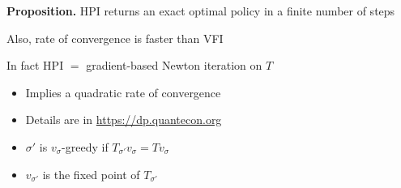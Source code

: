 \documentclass[xcolor=dvipsnames]{beamer}
\newcommand{\1}{\mathbbm 1}
\begin{document}
\begin{frame}
    
    \begin{block}{}
        {\bf Proposition.} 
            HPI returns an exact optimal policy in a finite number of steps
    \end{block}

    \vspace{0.5em}
    \vspace{0.5em}
    \vspace{0.5em}

    Also, rate of convergence is faster than VFI 

    \vspace{0.5em}
    \vspace{0.5em}

    In fact HPI $=$ gradient-based Newton iteration on $T$
    \vspace{0.5em}

    \begin{itemize}
        \item Implies a quadratic rate of convergence
        \vspace{0.5em}
        \item Details are in \url{https://dp.quantecon.org}
    \end{itemize}


\end{frame}

\begin{frame}
 
    \begin{figure} 
        \centering
    \end{figure}

    \begin{itemize}
        \item $\sigma'$ is $v_\sigma$-greedy if $T_{\sigma'} v_\sigma = T
            v_\sigma$
        \vspace{0.5em}
        \item $v_{\sigma'}$ is the fixed point of $T_{\sigma'}$
    \end{itemize}

\end{frame}
\end{document}
